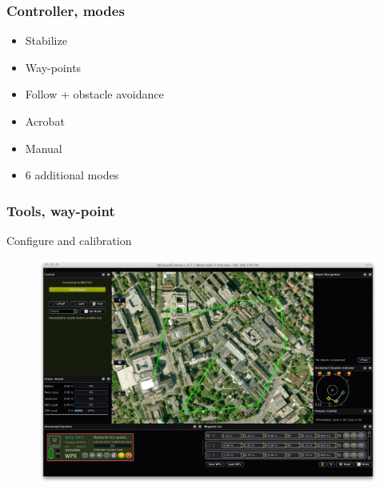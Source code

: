 \begin{frame}
\frametitle{Controller, modes}

  \begin{itemize}
    \item Stabilize    
    \item Way-points   
	\item Follow + obstacle avoidance
	\item Acrobat 	
	\item Manual 	
	\item 6 additional modes 
  \end{itemize}
  
\end{frame}



\begin{frame}
\frametitle{Tools, way-point}

  Configure and calibration
  \begin{figure}
  \includegraphics[scale=0.17]{pic/03_our-copter/qgroundcontrol.png}
  \end{figure}
  
\end{frame}



